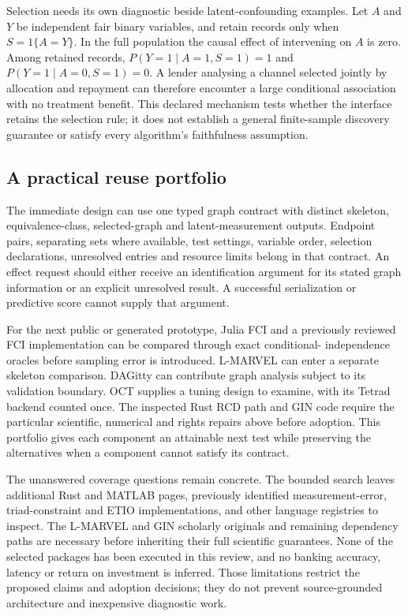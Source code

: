 Selection needs its own diagnostic beside latent-confounding examples.
Let \(A\) and \(Y\) be independent fair binary variables, and retain
records only when \(S=1\{A=Y\}\). In the full population the causal
effect of intervening on \(A\) is zero. Among retained records,
\(P(Y=1\mid A=1,S=1)=1\) and \(P(Y=1\mid A=0,S=1)=0\). A lender
analysing a channel selected jointly by allocation and repayment can
therefore encounter a large conditional association with no treatment
benefit. This declared mechanism tests whether the interface retains the
selection rule; it does not establish a general finite-sample discovery
guarantee or satisfy every algorithm's faithfulness assumption.
\citep{exec14_olatent_oracle}

\hypertarget{a-practical-reuse-portfolio}{%
\subsection{A practical reuse
portfolio}\label{a-practical-reuse-portfolio}}

The immediate design can use one typed graph contract with distinct
skeleton, equivalence-class, selected-graph and latent-measurement
outputs. Endpoint pairs, separating sets where available, test settings,
variable order, selection declarations, unresolved entries and resource
limits belong in that contract. An effect request should either receive
an identification argument for its stated graph information or an
explicit unresolved result. A successful serialization or predictive
score cannot supply that argument.

For the next public or generated prototype, Julia FCI and a previously
reviewed FCI implementation can be compared through exact conditional-
independence oracles before sampling error is introduced. L-MARVEL can
enter a separate skeleton comparison. DAGitty can contribute graph
analysis subject to its validation boundary. OCT supplies a tuning
design to examine, with its Tetrad backend counted once. The inspected
Rust RCD path and GIN code require the particular scientific, numerical
and rights repairs above before adoption. This portfolio gives each
component an attainable next test while preserving the alternatives when
a component cannot satisfy its contract.

The unanswered coverage questions remain concrete. The bounded search
leaves additional Rust and MATLAB pages, previously identified
measurement-error, triad-constraint and ETIO implementations, and other
language registries to inspect. The L-MARVEL and GIN scholarly originals
and remaining dependency paths are necessary before inheriting their
full scientific guarantees. None of the selected packages has been
executed in this review, and no banking accuracy, latency or return on
investment is inferred. Those limitations restrict the proposed claims
and adoption decisions; they do not prevent source-grounded architecture
and inexpensive diagnostic work. \citep{exec14_olatent_search}

